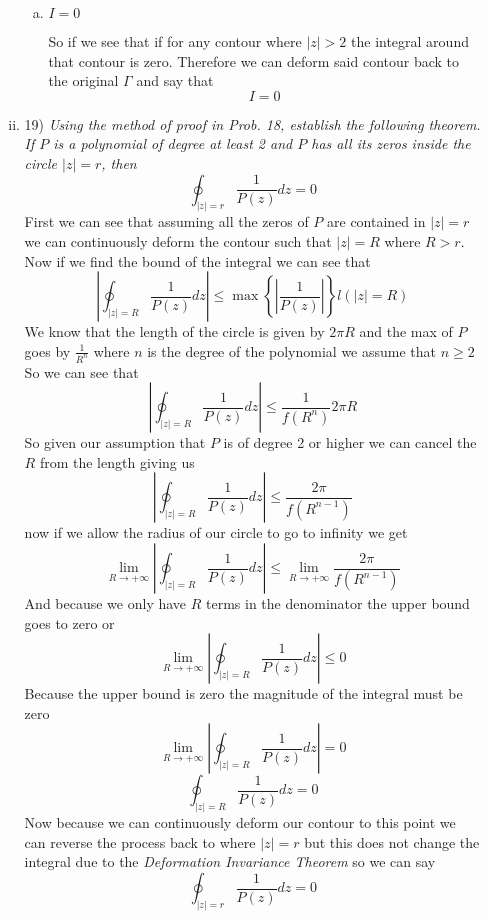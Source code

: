 \documentclass[11pt]{article}
\begin{document}
\begin{enumerate}
\begin{enumerate}[(i)]
\begin{enumerate}[(a)]
\item
$I=0$

So if we see that if for any contour where $|z|>2$ the integral around that contour is zero. Therefore we can deform said contour back to the original $\Gamma$ and say that 
$$I=0$$
\end{enumerate}
\item 19) \textit{Using the method of proof in Prob. 18, establish the following theorem. If $P$ is a polynomial of degree at least 2 and $P$ has all its zeros inside the circle $|z| = r$, then}
$$\oint_{|z|=r}\frac{1}{P(z)}dz=0$$
First we can see that assuming all the zeros of $P$ are contained in $|z|=r$ we can continuously deform the contour such that $|z|=R$ where $R>r$. Now if we find the bound of the integral we can see that
$$\left|\oint_{|z|=R}\frac{1}{P(z)}dz\right|\le \max\left\{\left|\frac{1}{P(z)}\right|\right\}l(|z|=R)$$
We know that the length of the circle is given by $2\pi R$ and the max of $P$ goes by $\frac{1}{R^n}$ where $n$ is the degree of the polynomial we assume that $n\ge2$ So we can see that
$$\left|\oint_{|z|=R}\frac{1}{P(z)}dz\right|\le \frac{1}{f(R^n)}2\pi R$$
So given our assumption that $P$ is of degree 2 or higher we can cancel the $R$ from the length giving us
$$\left|\oint_{|z|=R}\frac{1}{P(z)}dz\right|\le \frac{2\pi}{f(R^{n-1})}$$
now if we allow the radius of our circle to go to infinity we get
$$\lim_{R\rightarrow+\infty}\left|\oint_{|z|=R}\frac{1}{P(z)}dz\right|\le \lim_{R\rightarrow+\infty}\frac{2\pi}{f(R^{n-1})}$$
And because we only have $R$ terms in the denominator the upper bound goes to zero or
$$\lim_{R\rightarrow+\infty}\left|\oint_{|z|=R}\frac{1}{P(z)}dz\right|\le 0$$
Because the upper bound is zero the magnitude of the integral must be zero
$$\lim_{R\rightarrow+\infty}\left|\oint_{|z|=R}\frac{1}{P(z)}dz\right| = 0$$
$$\oint_{|z|=R}\frac{1}{P(z)}dz= 0$$
Now because we can continuously deform our contour to this point we can reverse the process back to where $|z|=r$ but this does not change the integral due to the \emph{Deformation Invariance Theorem} so we can say
$$\oint_{|z|=r}\frac{1}{P(z)}dz=0$$

\end{enumerate}
\end{enumerate}
\end{document}
